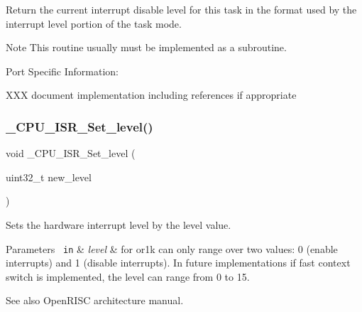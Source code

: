 Return the current interrupt disable level for this task in the format used by the interrupt level portion of the task mode.

\begin{DoxyNote}{Note}
This routine usually must be implemented as a subroutine.
\end{DoxyNote}
Port Specific Information\+:

X\+XX document implementation including references if appropriate \mbox{\label{group__RTEMSScoreCPUEpiphany_ga43820ba3d51d7a699c22fce8cac93ef1}} 
\subsubsection{\texorpdfstring{\_CPU\_ISR\_Set\_level()}{\_CPU\_ISR\_Set\_level()}}
{\footnotesize\ttfamily void \+\_\+\+C\+P\+U\+\_\+\+I\+S\+R\+\_\+\+Set\+\_\+level (\begin{DoxyParamCaption}\item[{uint32\+\_\+t}]{new\+\_\+level }\end{DoxyParamCaption})}



Sets the hardware interrupt level by the level value. 


\begin{DoxyParams}[1]{Parameters}
\mbox{\texttt{ in}}  & {\em level} & for or1k can only range over two values\+: 0 (enable interrupts) and 1 (disable interrupts). In future implementations if fast context switch is implemented, the level can range from 0 to 15. \\
\hline
\end{DoxyParams}
\begin{DoxySeeAlso}{See also}
Open\+R\+I\+SC architecture manual. 
\end{DoxySeeAlso}
